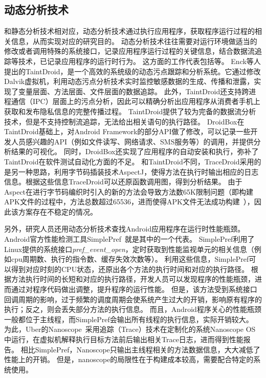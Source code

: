 \subsection{动态分析技术}

和静态分析技术相对应，动态分析技术通过执行应用程序，获取程序运行过程的相关信息，从而实现对应的研究目的。
动态分析技术往往需要对运行环境做适当的修改或者调用特殊的系统接口，记录应用程序运行过程的关键信息，结合数据流追踪等技术，已记录应用程序的运行时行为。
这方面的工作代表包括\cite{chun2014taintdroid,droidbox:online,van2013dynamic,droidscope}等。
Enck等人提出的TaintDroid\cite{chun2014taintdroid}，是一个高效的系统级的动态污点跟踪和分析系统。它通过修改Dalvik虚拟机，利用动态污点分析技术实时监控敏感数据的生成、传播和泄露，实现了变量层面、方法层面、文件层面的数据追踪。
此外，TaintDroid还支持跨进程通信（IPC）层面上的污点分析，因此可以精确分析出应用程序从消费者手机上获取和发布隐私信息的完整传播过程。
TaintDroid提供了较为完备的数据流分析技术，但是不支持控制流追踪，无法给出相关语句的执行路径。
DroidBox\cite{droidbox:online}在TaintDroid基础上，对Android Framework的部分API做了修改，可以记录一些开发人员感兴趣的API（例如文件读写、网络请求、SMS服务等）的调用，并提供分析结果的可视化。
同时，DroidBox还实现了应用程序的自动安装和执行，弥补了TaintDroid在软件测试自动化方面的不足。
和TaintDroid不同，TraceDroid\cite{van2013dynamic}采用的是另一种思路，利用字节码插装技术AspectJ，使得方法在执行时输出相应的日志信息。根据这些信息TraceDroid可以还原函数调用图，得到分析结果。
由于Aspect在进行字节码编织时引入的新的方法会导致方法数65K限制问题（即构建APK文件的过程中，方法总数超过65536，进而使得APK文件无法成功构建~\cite{Configur27}），因此该方案存在不稳定的情况。

另外，研究人员还用动态分析技术查找Android应用程序在运行时性能瓶颈。Android官方性能检测工具SimplePref~\cite{simpleperf:online}就是其中的一个代表。
SimplePref利用了Linux提供的系统接口\textit{pref\_event\_open}，定时获取到性能监视单元的相关信息（例如cpu周期数、执行的指令数、缓存失效次数等）。
利用这些信息，SimplePref可以得到对应时刻的CPU状态，还原出各个方法的执行时间和对应的执行路径。
根据方法执行时间的长短和对应的执行路径，开发人员可以发现程序的性能瓶颈，进而通过对程序代码做出调整，提升程序的运行性能。
但是，该方法受到系统接口回调周期的影响，过于频繁的调度周期会使系统产生过大的开销，影响原有程序的执行；反之，则会丢失部分方法的执行信息。
而且，Android程序关心的性能瓶颈一般都位于主线程，而SimplePref会输出所有线程的执行信息，实际开销较大。
为此，Uber的Nanoscope~\cite{ubernanoscope:online}采用追踪（Trace）技术在定制化的系统Nanoscope OS中运行，在虚拟机解释执行目标方法前后输出相关Trace日志，进而得到性能报告。
相比SimplePref，Nanoscope只输出主线程相关的方法数据信息，大大减低了性能上的开销。
但是，nanoscope的局限性在于构建成本较高，需要配合特定的系统使用。




